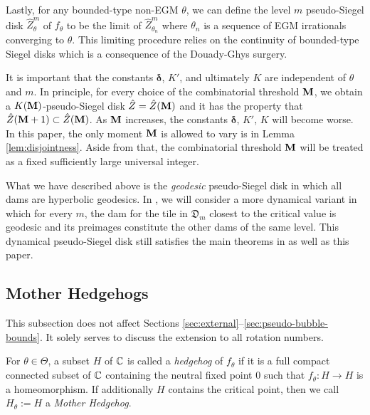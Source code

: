 \documentclass{amsart}
\begin{document}
Lastly, for any bounded-type non-EGM $\theta$, we can define the level $m$ pseudo-Siegel disk $\hat{Z}^m_\theta$ of $f_\theta$ to be the limit of $\hat{Z}^m_{\theta_n}$ where $\theta_n$ is a sequence of EGM irrationals converging to $\theta$.
This limiting procedure relies on the continuity of bounded-type Siegel disks which is a consequence of the Douady-Ghys surgery.

\begin{remark}
\label{rem:combinatorial-threshold}
    It is important that the constants $\boldsymbol{\delta}$, $K'$, and ultimately $K$ are independent of $\theta$ and $m$. 
    In principle, for every choice of the combinatorial threshold $\mathbf{M}$, we obtain a $K(\mathbf{M})$-pseudo-Siegel disk $\hat{Z} = \hat{Z}(\mathbf{M})$ and it has the property that $\hat{Z}(\mathbf{M}+1) \subset \hat{Z}(\mathbf{M})$.
    As $\mathbf{M}$ increases, the constants $\boldsymbol{\delta}$, $K'$, $K$ will become worse. 
    In this paper, the only moment $\mathbf{M}$ is allowed to vary is in Lemma \ref{lem:disjointness}.
    Aside from that, the combinatorial threshold $\mathbf{M}$ will be treated as a fixed sufficiently large universal integer.
\end{remark}

\begin{remark}
    What we have described above is the \emph{geodesic} pseudo-Siegel disk in which all dams are hyperbolic geodesics.
    In \cite{DLL}, we will consider a more dynamical variant in which for every $m$, the dam for the tile in $\mathfrak{D}_m$ closest to the critical value is geodesic and its preimages constitute the other dams of the same level.
    This dynamical pseudo-Siegel disk still satisfies the main theorems in \cite{DL22} as well as this paper.
\end{remark}

\subsection{Mother Hedgehogs}
\label{ss:mother-hedgehog}

This subsection does not affect Sections \ref{sec:external}--\ref{sec:pseudo-bubble-bounds}.
It solely serves to discuss the extension to all rotation numbers.

\begin{definition}
    For $\theta \in \Theta$, a subset $H$ of $\mathbb{C}$ is called a \emph{hedgehog} of $f_\theta$ if it is a full compact connected subset of $\mathbb{C}$ containing the neutral fixed point $0$ such that $f_\theta: H \to H$ is a homeomorphism. 
    If additionally $H$ contains the critical point, then we call $H_\theta := H$ a \emph{Mother Hedgehog}.
\end{definition}
\end{document}
